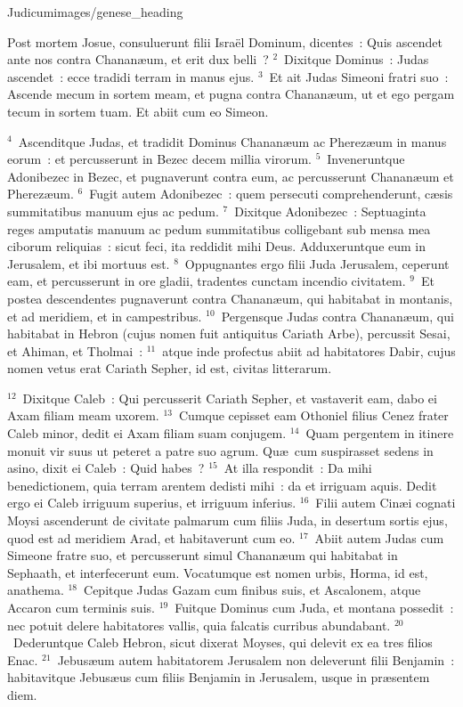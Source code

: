{Judicum}{images/genese_heading}


\lettrine[lines=10,image=true,loversize=0.05,lraise=-0.03]{P}{}ost mortem Josue, consuluerunt filii Isra\"el Dominum, dicentes~: Quis ascendet ante nos contra Chanan\ae um, et erit dux belli~?
${}^{2}$~Dixitque Dominus~: Judas ascendet~: ecce tradidi terram in manus ejus.
${}^{3}$~Et ait Judas Simeoni fratri suo~: Ascende mecum in sortem meam, et pugna contra Chanan\ae um, ut et ego pergam tecum in sortem tuam. Et abiit cum eo Simeon.


${}^{4}$~Ascenditque Judas, et tradidit Dominus Chanan\ae um ac Pherez\ae um in manus eorum~: et percusserunt in Bezec decem millia virorum.
${}^{5}$~Inveneruntque Adonibezec in Bezec, et pugnaverunt contra eum, ac percusserunt Chanan\ae um et Pherez\ae um.
${}^{6}$~Fugit autem Adonibezec~: quem persecuti comprehenderunt, c\ae sis summitatibus manuum ejus ac pedum.
${}^{7}$~Dixitque Adonibezec~: Septuaginta reges amputatis manuum ac pedum summitatibus colligebant sub mensa mea ciborum reliquias~: sicut feci, ita reddidit mihi Deus. Adduxeruntque eum in Jerusalem, et ibi mortuus est.
${}^{8}$~Oppugnantes ergo filii Juda Jerusalem, ceperunt eam, et percusserunt in ore gladii, tradentes cunctam incendio civitatem.
${}^{9}$~Et postea descendentes pugnaverunt contra Chanan\ae um, qui habitabat in montanis, et ad meridiem, et in campestribus.
${}^{10}$~Pergensque Judas contra Chanan\ae um, qui habitabat in Hebron (cujus nomen fuit antiquitus Cariath Arbe), percussit Sesai, et Ahiman, et Tholmai~:
${}^{11}$~atque inde profectus abiit ad habitatores Dabir, cujus nomen vetus erat Cariath Sepher, id est, civitas litterarum.


${}^{12}$~Dixitque Caleb~: Qui percusserit Cariath Sepher, et vastaverit eam, dabo ei Axam filiam meam uxorem.
${}^{13}$~Cumque cepisset eam Othoniel filius Cenez frater Caleb minor, dedit ei Axam filiam suam conjugem.
${}^{14}$~Quam pergentem in itinere monuit vir suus ut peteret a patre suo agrum. Qu\ae\ cum suspirasset sedens in asino, dixit ei Caleb~: Quid habes~?
${}^{15}$~At illa respondit~: Da mihi benedictionem, quia terram arentem dedisti mihi~: da et irriguam aquis. Dedit ergo ei Caleb irriguum superius, et irriguum inferius.
${}^{16}$~Filii autem Cin\ae i cognati Moysi ascenderunt de civitate palmarum cum filiis Juda, in desertum sortis ejus, quod est ad meridiem Arad, et habitaverunt cum eo.
${}^{17}$~Abiit autem Judas cum Simeone fratre suo, et percusserunt simul Chanan\ae um qui habitabat in Sephaath, et interfecerunt eum. Vocatumque est nomen urbis, Horma, id est, anathema.
${}^{18}$~Cepitque Judas Gazam cum finibus suis, et Ascalonem, atque Accaron cum terminis suis.
${}^{19}$~Fuitque Dominus cum Juda, et montana possedit~: nec potuit delere habitatores vallis, quia falcatis curribus abundabant.
${}^{20}$~Dederuntque Caleb Hebron, sicut dixerat Moyses, qui delevit ex ea tres filios Enac.
${}^{21}$~Jebus\ae um autem habitatorem Jerusalem non deleverunt filii Benjamin~: habitavitque Jebus\ae us cum filiis Benjamin in Jerusalem, usque in pr\ae sentem diem.



